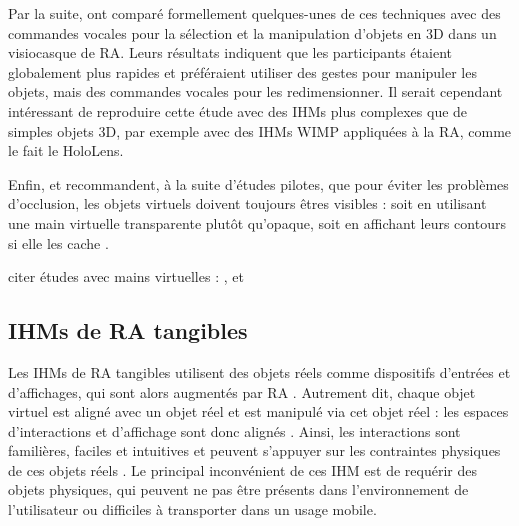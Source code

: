 
Par la suite, \cite{Piumsomboon2014} ont comparé formellement quelques-unes de ces techniques avec des commandes vocales pour la sélection et la manipulation d'objets en 3D dans un visiocasque de RA. Leurs résultats indiquent que les participants étaient globalement plus rapides et préféraient utiliser des gestes pour manipuler les objets, mais des commandes vocales pour les redimensionner. Il serait cependant intéressant de reproduire cette étude avec des IHMs plus complexes que de simples objets 3D, par exemple avec des IHMs WIMP appliquées à la RA, comme le fait le HoloLens.


Enfin, \cite{Piumsomboon2013} et \cite{Piumsomboon2014} recommandent, à la suite d'études pilotes, que pour éviter les problèmes d'occlusion, les objets virtuels doivent toujours êtres visibles : soit en utilisant une main virtuelle transparente plutôt qu'opaque, soit en affichant leurs contours si elle les cache .

citer études avec mains virtuelles : \cite{Chan2010}, \cite{Markussen2014} et \cite{Hincapie-Ramos2014}

\subsection{IHMs de RA tangibles}
\label{subsec:litterature_ar_hci_tui}
Les IHMs de RA tangibles utilisent des objets réels comme dispositifs d'entrées et d'affichages, qui sont alors augmentés par RA \citep{Kato2000}. Autrement dit, chaque objet virtuel est aligné avec un objet réel et est manipulé via cet objet réel \citep{Billinghurst2005} : les espaces d'interactions et d'affichage sont donc alignés \citep[p. 170]{Billinghurst2015}. Ainsi, les interactions sont familières, faciles et intuitives et peuvent s'appuyer sur les contraintes physiques de ces objets réels \citep{Zhou2008}. Le principal inconvénient de ces IHM est de requérir des objets physiques, qui peuvent ne pas être présents dans l'environnement de l'utilisateur ou difficiles à transporter dans un usage mobile.


